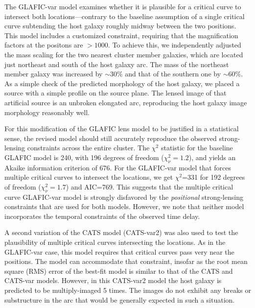 The GLAFIC-var model examines whether it is plausible for a critical
curve to intersect both \spock locations---contrary to the baseline
assumption of a single critical curve subtending the \spock host
galaxy roughly midway between the two positions.  This model includes
a customized constraint, requiring that the magnification factors at
the \spock positons are $>1000$.  To achieve this, we independently
adjusted the mass scaling for the two nearest cluster member galaxies,
which are located just northeast and south of the \spock host galaxy
arc.  The mass of the northeast member galaxy was increased by
$\sim$30\% and that of the southern one by $\sim$60\%.  As a simple
check of the predicted morphology of the host galaxy, we placed a
source with a simple \citet{Sersic:1963} profile on the source
plane. The lensed image of that artificial source is an unbroken
elongated arc, reproducing the host galaxy image morphology reasonably
well.

For this modification of the GLAFIC lens model to be justified in a
statistical sense, the revised model should still accurately reproduce
the observed strong-lensing constraints across the entire cluster.
The $\chi^2$ statistic for the baseline GLAFIC model is 240, with 196
degrees of freedom ($\chi^2_\nu=1.2$), and yields an Akaike
information criterion \citep[AIC][]{Akaike:1974} of 676.  For the
GLAFIC-var model that forces multiple critical curves to intersect the
\spock locations, we get $\chi^2$=331 for 192 degrees of freedom
($\chi^2_\nu=1.7$) and AIC=769.  This suggests that the multiple
critical curve GLAFIC-var model is strongly disfavored by the
{\it positional} strong-lensing constraints that are used for both models.
However, we note that neither model incorporates the temporal
constraints of the observed time delay. 

A second variation of the CATS model (CATS-var2) was also used to test
the plausibility of multiple critical curves intersecting the \spock
locations.  As in the GLAFIC-var case, this model requires that
critical curves pass very near the \spock positions.  The model can
accommodate that constraint, insofar as the root mean square (RMS)
error of the best-fit model is similar to that of the CATS and
CATS-var models.  However, in this CATS-var2 model the \spock host
galaxy is predicted to be multiply-imaged 5 times. The \HST images do
not exhibit any breaks or substructure in the arc that would be
generally expected in such a situation.  

